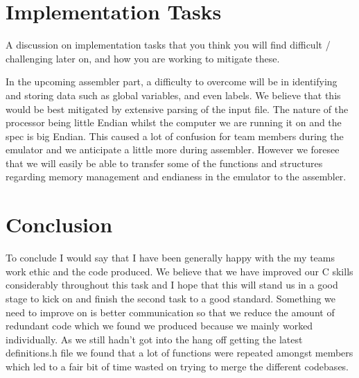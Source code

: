 \documentclass[a4paper,12pt]{article}
\begin{document}
\section{Implementation Tasks}

A discussion on implementation tasks that you think you will find difficult / challenging later on,
and how you are working to mitigate these.

In the upcoming assembler part, a difficulty to overcome will be in identifying and storing data such as global variables, and even labels. We believe that this would be best mitigated by extensive parsing of the input file.
The nature of the processor being little Endian whilst the computer we are running it on and the spec is big Endian. This caused a lot of confusion for team members during the emulator and we anticipate a little more during assembler. However we foresee that we will easily be able to transfer some of the functions and structures regarding memory management and endianess in the emulator to the assembler.

\section{Conclusion}

To conclude I would say that I have been generally happy with the my teams work ethic and the code produced. We believe that we have improved our C skills considerably throughout this task and I hope that this will stand us in a good stage to kick on and finish the second task to a good standard. Something we need to improve on is better communication so that we reduce the amount of redundant code which we found we produced because we mainly worked individually. As we still hadn't got into the hang off getting the latest definitions.h file we found that a lot of functions were repeated amongst members which led to a fair bit of time wasted on trying to merge the different codebases.
\end{document}
